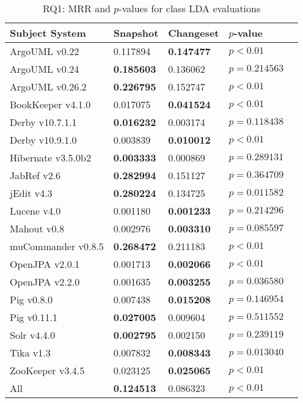 
\begin{table}[t]
\renewcommand{\arraystretch}{1.3}
\footnotesize
\centering
\caption{RQ1: MRR and $p$-values for class LDA evaluations}
\begin{tabular}{l|ll|ll}
   \toprule
    Subject System & Snapshot & Changeset & $p$-value  \\
    \midrule

ArgoUML v0.22 & 0.117894 & {\bf 0.147477 } & $p < 0.01$ \\
ArgoUML v0.24 & {\bf 0.185603 } & 0.136062 & $p = 0.214563$ \\
ArgoUML v0.26.2 & {\bf 0.226795 } & 0.152747 & $p < 0.01$ \\
BookKeeper v4.1.0 & 0.017075 & {\bf 0.041524 } & $p < 0.01$ \\
Derby v10.7.1.1 & {\bf 0.016232 } & 0.003174 & $p = 0.118438$ \\
Derby v10.9.1.0 & 0.003839 & {\bf 0.010012 } & $p < 0.01$ \\
Hibernate v3.5.0b2 & {\bf 0.003333 } & 0.000869 & $p = 0.289131$ \\
JabRef v2.6 & {\bf 0.282994 } & 0.151127 & $p = 0.364709$ \\
jEdit v4.3 & {\bf 0.280224 } & 0.134725 & $p = 0.011582$ \\
Lucene v4.0 & 0.001180 & {\bf 0.001233 } & $p = 0.214296$ \\
Mahout v0.8 & 0.002976 & {\bf 0.003310 } & $p = 0.085597$ \\
muCommander v0.8.5 & {\bf 0.268472 } & 0.211183 & $p < 0.01$ \\
OpenJPA v2.0.1 & 0.001713 & {\bf 0.002066 } & $p < 0.01$ \\
OpenJPA v2.2.0 & 0.001635 & {\bf 0.003255 } & $p = 0.036580$ \\
Pig v0.8.0 & 0.007438 & {\bf 0.015208 } & $p = 0.146954$ \\
Pig v0.11.1 & {\bf 0.027005 } & 0.009604 & $p = 0.511552$ \\
Solr v4.4.0 & {\bf 0.002795 } & 0.002150 & $p = 0.239119$ \\
Tika v1.3 & 0.007832 & {\bf 0.008343 } & $p = 0.013040$ \\
ZooKeeper v3.4.5 & 0.023125 & {\bf 0.025065 } & $p < 0.01$ \\
\midrule
All & {\bf 0.124513 } & 0.086323 & $p < 0.01$ \\

    \bottomrule
\end{tabular}
\label{table:rq1:class:lda}
\end{table}

